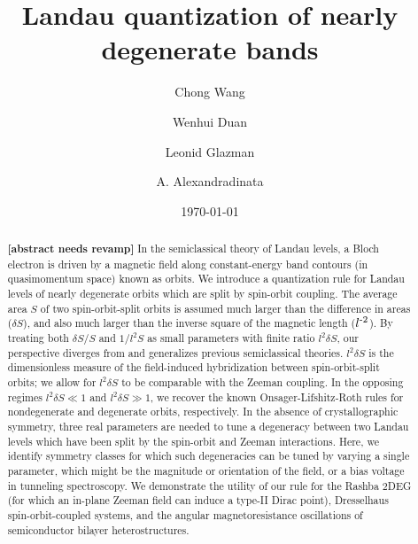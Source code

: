 \documentclass[aps, prb, showpacs, twocolumn, notitlepage, superscriptaddress]{revtex4-1}
\begin{document}
\title{Landau quantization of nearly degenerate bands}

\author{Chong Wang}
\author{Wenhui Duan}
\author{Leonid Glazman}
\author{A. Alexandradinata}

\begin{abstract}
\textbf{[abstract needs revamp]}
 In the semiclassical theory of Landau levels, a Bloch electron is driven by a magnetic field  along constant-energy band contours  (in quasimomentum space) known as orbits. We introduce a quantization rule for Landau levels of nearly degenerate orbits which are split by spin-orbit coupling. The average area $S$ of two spin-orbit-split orbits is assumed much larger than the difference in areas ($\delta S$), and also much larger than the inverse square of the magnetic length ($l^{\text{-}2}$). By treating both $\delta S/S$ and $1/l^2S$ as small parameters with finite ratio $l^2\delta S$, our perspective diverges from and generalizes previous semiclassical theories.  $l^2\delta S$ is the dimensionless measure of the field-induced hybridization between spin-orbit-split orbits; we allow for $l^2\delta S$ to be comparable with the Zeeman coupling. In the opposing regimes $l^2\delta S {{\ll}} 1$  and $l^2\delta S{\gg}1$, we recover the known Onsager-Lifshitz-Roth rules for nondegenerate and degenerate orbits, respectively.  In the absence of crystallographic symmetry, three real parameters are needed to tune a degeneracy between two Landau levels which have been split by the spin-orbit and Zeeman interactions. Here, we identify symmetry classes for which such degeneracies can be tuned by varying a single parameter, which might be the magnitude or orientation of the field, or a bias voltage in tunneling spectroscopy.  We demonstrate the utility of our rule for the Rashba 2DEG (for which an in-plane Zeeman field can induce a type-II Dirac point), Dresselhaus spin-orbit-coupled systems, and the angular magnetoresistance oscillations of semiconductor bilayer heterostructures.      
\end{abstract}
\date{\today}
\end{document}
